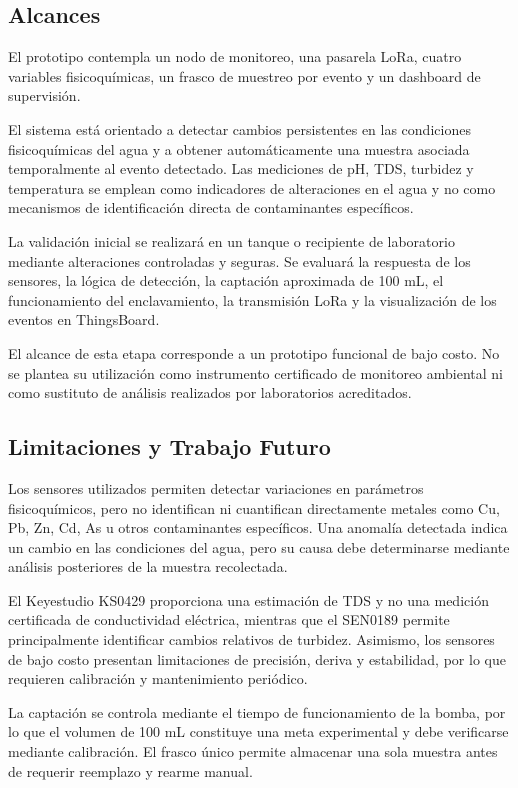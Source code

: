 \documentclass[11pt,a4paper]{article}
\begin{document}
\subsection{Alcances}

El prototipo contempla un nodo de monitoreo, una pasarela LoRa, cuatro variables fisicoquímicas, un frasco de muestreo por evento y un dashboard de supervisión.

El sistema está orientado a detectar cambios persistentes en las condiciones fisicoquímicas del agua y a obtener automáticamente una muestra asociada temporalmente al evento detectado. Las mediciones de pH, TDS, turbidez y temperatura se emplean como indicadores de alteraciones en el agua y no como mecanismos de identificación directa de contaminantes específicos.

La validación inicial se realizará en un tanque o recipiente de laboratorio mediante alteraciones controladas y seguras. Se evaluará la respuesta de los sensores, la lógica de detección, la captación aproximada de 100 mL, el funcionamiento del enclavamiento, la transmisión LoRa y la visualización de los eventos en ThingsBoard.

El alcance de esta etapa corresponde a un prototipo funcional de bajo costo. No se plantea su utilización como instrumento certificado de monitoreo ambiental ni como sustituto de análisis realizados por laboratorios acreditados.

\subsection{Limitaciones y Trabajo Futuro}

Los sensores utilizados permiten detectar variaciones en parámetros fisicoquímicos, pero no identifican ni cuantifican directamente metales como Cu, Pb, Zn, Cd, As u otros contaminantes específicos. Una anomalía detectada indica un cambio en las condiciones del agua, pero su causa debe determinarse mediante análisis posteriores de la muestra recolectada.

El Keyestudio KS0429 proporciona una estimación de TDS y no una medición certificada de conductividad eléctrica, mientras que el SEN0189 permite principalmente identificar cambios relativos de turbidez. Asimismo, los sensores de bajo costo presentan limitaciones de precisión, deriva y estabilidad, por lo que requieren calibración y mantenimiento periódico.

La captación se controla mediante el tiempo de funcionamiento de la bomba, por lo que el volumen de 100 mL constituye una meta experimental y debe verificarse mediante calibración. El frasco único permite almacenar una sola muestra antes de requerir reemplazo y rearme manual.
\end{document}
